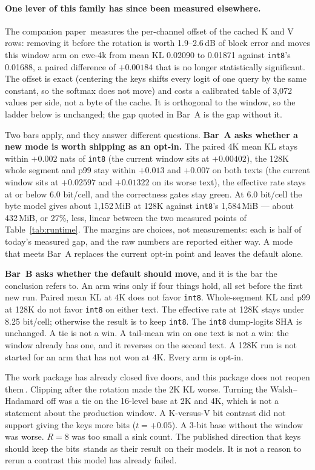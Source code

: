 \documentclass[10pt,twocolumn]{article}
\begin{document}
\paragraph{One lever of this family has since been measured elsewhere.} The companion paper\,\cite{mean-centered} measures the per-channel offset of the cached K and V rows: removing it before the rotation is worth 1.9--2.6\,dB of block error and moves this window arm on cwe-4k from mean KL 0.02090 to 0.01871 against \texttt{int8}'s 0.01688, a paired difference of $+0.00184$ that is no longer statistically significant. The offset is exact (centering the keys shifts every logit of one query by the same constant, so the softmax does not move) and costs a calibrated table of 3,072 values per side, not a byte of the cache. It is orthogonal to the window, so the ladder below is unchanged; the gap quoted in Bar~A is the gap without it.

Two bars apply, and they answer different questions. \textbf{Bar~A asks whether a new mode is worth shipping as an opt-in.} The paired 4K mean KL stays within $+0.002$ nats of \texttt{int8} (the current window sits at $+0.00402$), the 128K whole segment and p99 stay within $+0.013$ and $+0.007$ on both texts (the current window sits at $+0.02597$ and $+0.01322$ on its worse text), the effective rate stays at or below 6.0 bit/cell, and the correctness gates stay green. At 6.0 bit/cell the byte model gives about 1,152\,MiB at 128K against \texttt{int8}'s 1,584\,MiB --- about 432\,MiB, or 27\%, less, linear between the two measured points of Table~\ref{tab:runtime}. The margins are choices, not measurements: each is half of today's measured gap, and the raw numbers are reported either way. A mode that meets Bar~A replaces the current opt-in point and leaves the default alone.

\textbf{Bar~B asks whether the default should move}, and it is the bar the conclusion refers to. An arm wins only if four things hold, all set before the first new run. Paired mean KL at 4K does not favor \texttt{int8}. Whole-segment KL and p99 at 128K do not favor \texttt{int8} on either text. The effective rate at 128K stays under 8.25 bit/cell; otherwise the result is to keep \texttt{int8}. The \texttt{int8} dump-logits SHA is unchanged. A tie is not a win. A tail-mean win on one text is not a win: the window already has one, and it reverses on the second text. A 128K run is not started for an arm that has not won at 4K. Every arm is opt-in.

The work package has already closed five doors, and this package does not reopen them\,\cite{strata-wp}. Clipping after the rotation made the 2K KL worse. Turning the Walsh--Hadamard off was a tie on the 16-level base at 2K and 4K, which is not a statement about the production window. A K-versus-V bit contrast did not support giving the keys more bits ($t{=}{+}0.05$). A 3-bit base without the window was worse. $R{=}8$ was too small a sink count. The published direction that keys should keep the bits\,\cite{spectralkv} stands as their result on their models. It is not a reason to rerun a contrast this model has already failed.
\end{document}
